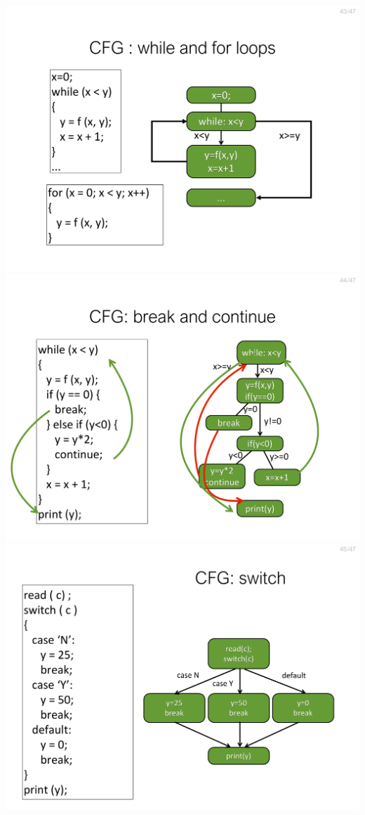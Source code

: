 \documentclass[a4paper]{article}
\begin{document}
\begin{multicols}{3}
        \includegraphics[width=\linewidth]{43.pdf}\\
        \includegraphics[width=\linewidth]{44.pdf}\\
        \includegraphics[width=\linewidth]{45.pdf}\\

\end{multicols}
\end{document}
